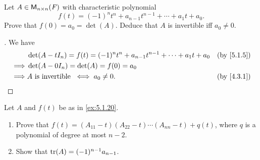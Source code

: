 \begin{ex}\label{ex:5.1.20}
	Let \(A \in \mathsf{M}_{{n} \times n}({\mathit{F}})\) with characteristic polynomial
	\[
		f(t) = (-1)^n t^n + a_{n - 1} t^{n - 1} + \cdots + a_1 t + a_0.
	\]
	Prove that \(f(0) = a_0 = \det(A)\).
	Deduce that \(A\) is invertible iff \(a_0 \neq 0\).
\end{ex}

\begin{proof}[]
	We have
	\begin{align*}
		         & \det(A - t I_n) = f(t) = (-1)^n t^n + a_{n - 1} t^{n - 1} + \cdots + a_1 t + a_0 &  & \by{5.1.5} \\
		\implies & \det(A - 0 I_n) = \det(A) = f(0) = a_0                                                           \\
		\implies & A \text{ is invertible } \iff a_0 \neq 0.                                        &  & \by{4.3.1}
	\end{align*}
\end{proof}

\begin{ex}\label{ex:5.1.21}
	Let \(A\) and \(f(t)\) be as in \cref{ex:5.1.20}.
	\begin{enumerate}
		\item Prove that \(f(t) = (A_{1 1} - t)(A_{2 2} - t) \cdots (A_{n n} - t) + q(t)\), where \(q\) is a polynomial of degree at most \(n - 2\).
		\item Show that \(\tr(A) = (-1)^{n - 1} a_{n - 1}\).
	\end{enumerate}
\end{ex}

